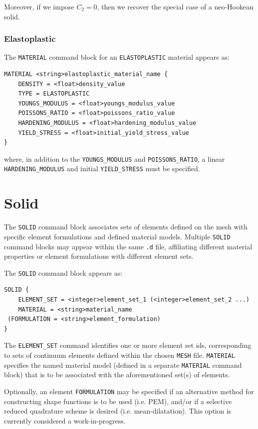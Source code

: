 \documentclass[11pt]{article} %
\begin{document}
Moreover, if we impose $C_{2} = 0$, then we recover the special case of a neo-Hookean solid.

\subsubsection{Elastoplastic}

The \texttt{MATERIAL} command block for an \texttt{ELASTOPLASTIC} material appears as:
\begin{lstlisting}
MATERIAL <string>elastoplastic_material_name {
	DENSITY = <float>density_value
	TYPE = ELASTOPLASTIC
	YOUNGS_MODULUS = <float>youngs_modulus_value
	POISSONS_RATIO = <float>poissons_ratio_value
	HARDENING_MODULUS = <float>hardening_modulus_value
	YIELD_STRESS = <float>initial_yield_stress_value
}
\end{lstlisting}
where, in addition to the \texttt{YOUNGS\_MODULUS} and \texttt{POISSONS\_RATIO}, a linear \texttt{HARDENING\_MODULUS} and initial \texttt{YIELD\_STRESS} must be specified.

\section{Solid} \label{solid_section} The \texttt{SOLID} command block associates sets of elements defined on the mesh with specific element formulations and defined material models. Multiple \texttt{SOLID} command blocks may appear within the same \texttt{.d} file, affiliating different material properties or element formulations with different element sets.

The \texttt{SOLID} command block appears as:
\begin{lstlisting}
SOLID {
	ELEMENT_SET = <integer>element_set_1 (<integer>element_set_2 ...)
	MATERIAL = <string>material_name
 (FORMULATION = <string>element_formulation)
}
\end{lstlisting}
The \texttt{ELEMENT\_SET} command identifies one or more element set ids, corresponding to sets of continuum elements defined within the chosen \texttt{MESH} file. \texttt{MATERIAL} specifies the named material model (defined in a separate \texttt{MATERIAL} command block) that is to be associated with the aforementioned set(s) of elements.

Optionally, an element \texttt{FORMULATION} may be specified if an alternative method for constructing shape functions is to be used (i.e. PEM), and/or if a selective reduced quadrature scheme is desired (i.e. mean-dilatation). This option is currently considered a work-in-progress.
\end{document}
